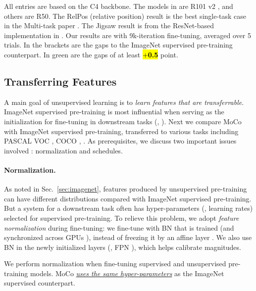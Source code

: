 \documentclass[10pt,twocolumn,letterpaper]{article}
\begin{document}
\begin{table}[t]
{All entries are based on the C4 backbone.
The models in \cite{Doersch2017} are R101 v2 \cite{He2016a}, and others are R50.
The RelPos (relative position) \cite{Doersch2015} result is the best single-task case in the Multi-task paper \cite{Doersch2017}.
The Jigsaw \cite{Noroozi2016} result is from the ResNet-based implementation in \cite{Goyal2019}.
Our results are with 9k-iteration fine-tuning, averaged over 5 trials.
In the brackets are the gaps to the ImageNet supervised pre-training counterpart. In green are the gaps of at least {\fontsize{8pt}{1em}\selectfont \hl{${+}$\textbf{0.5}}} point.
}
\label{tab:voc07}
\vspace{-1.em}
\end{table}

\subsection{Transferring Features}
\label{sec:transfer}

A main goal of unsupervised learning is to \emph{learn features that are transferrable}. ImageNet supervised pre-training is most influential when serving as the initialization for fine-tuning in downstream tasks (\eg, \cite{Girshick2014,Girshick2015,Long2015,Ren2015}).
Next we compare MoCo with ImageNet supervised pre-training, transferred to various tasks including PASCAL VOC \cite{Everingham2010}, COCO \cite{Lin2014}, \etc.
As prerequisites, we discuss two important issues involved \cite{He2019}: normalization and schedules.

\paragraph{Normalization.} As noted in Sec.~\ref{sec:imagenet}, features produced by unsupervised pre-training can have different distributions compared with ImageNet supervised pre-training. 
But a system for a downstream task often has hyper-parameters (\eg, learning rates) selected for supervised pre-training.
To relieve this problem, we adopt \emph{feature normalization} during fine-tuning: we fine-tune with BN that is trained (and synchronized across GPUs \cite{Peng2018}), instead of freezing it by an affine layer \cite{He2016}. We also use BN in the newly initialized layers (\eg, FPN \cite{Lin2017}), which helps calibrate magnitudes.

We perform normalization when fine-tuning supervised and unsupervised pre-training models. MoCo \ul{\emph{uses the same hyper-parameters}} as the ImageNet supervised counterpart.
\end{document}
